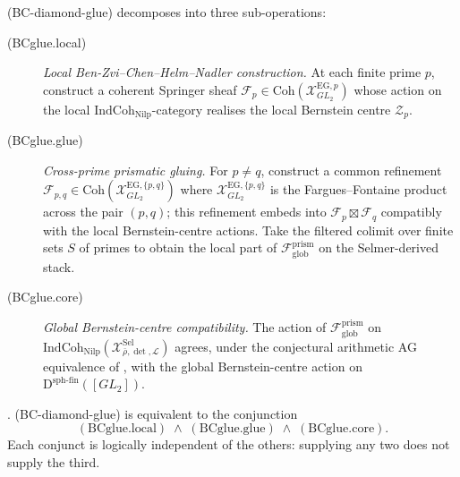 \begin{definition}
\label{v4-arith:bcglue-k5:def:three-sub-operations}
(BC-diamond-glue) decomposes into three sub-operations:
\begin{description}
\item[(BCglue.local)] \emph{Local Ben-Zvi--Chen--Helm--Nadler construction.} At each
finite prime \(p\), construct a coherent Springer sheaf
\(\mathcal{F}_{p}\in\mathrm{Coh}(\mathcal{X}^{\mathrm{EG},p}_{GL_{2}})\)
whose action on the local \(\mathrm{IndCoh}_{\mathrm{Nilp}}\)-category
realises the local Bernstein centre \(\mathcal{Z}_{p}\).
\item[(BCglue.glue)] \emph{Cross-prime prismatic gluing.} For
\(p\neq q\), construct a common refinement
\(\mathcal{F}_{p,q}\in\mathrm{Coh}(\mathcal{X}^{\mathrm{EG},\{p,q\}}_{GL_{2}})\)
where \(\mathcal{X}^{\mathrm{EG},\{p,q\}}_{GL_{2}}\) is the
Fargues--Fontaine product across the pair \((p,q)\); this refinement
embeds into \(\mathcal{F}_{p}\boxtimes\mathcal{F}_{q}\) compatibly
with the local Bernstein-centre actions. Take the filtered colimit
over finite sets \(S\) of primes to obtain the local part of
\(\mathcal{F}_{\mathrm{glob}}^{\mathrm{prism}}\) on the
Selmer-derived stack.
\item[(BCglue.core)] \emph{Global Bernstein-centre compatibility.}
The action of \(\mathcal{F}_{\mathrm{glob}}^{\mathrm{prism}}\) on
\(\mathrm{IndCoh}_{\mathrm{Nilp}}(\mathcal{X}^{\mathrm{Sel}}_{\bar\rho,\det,\mathcal{L}})\)
agrees, under the conjectural arithmetic AG equivalence of
, with the global Bernstein-centre
action on \(\mathrm{D}^{\mathrm{sph\text{-}fin}}([GL_{2}])\).
\end{description}
\end{definition}

\begin{theorem}
\label{v4-arith:bcglue-k5:thm:decomposition}
\ClaimStatusProvedHere. (BC-diamond-glue) is equivalent to the
conjunction
\[
(\mathrm{BCglue.local})\;\wedge\;(\mathrm{BCglue.glue})\;\wedge\;(\mathrm{BCglue.core}).
\]
Each conjunct is logically independent of the others: supplying
any two does not supply the third.
\end{theorem}

